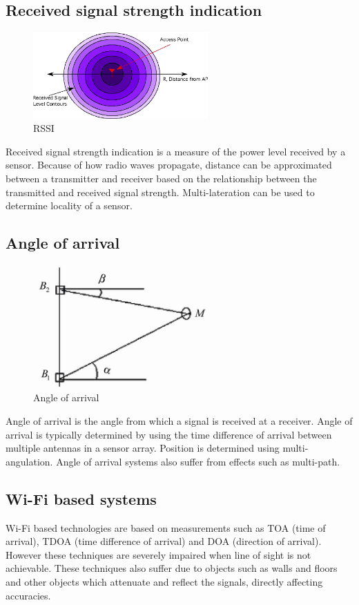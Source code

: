 \documentclass[11pt,a4paper]{report}
\begin{document}
	\subsection{Received signal strength indication}
		\begin{figure}[h!]
			\centering
			\includegraphics[width=0.6\textwidth]{rssi}
			\caption{RSSI}
		\end{figure}
		Received signal strength indication is a measure of the power level received by a sensor. Because of how radio waves propagate, distance can be approximated between a transmitter and receiver based on the relationship between the transmitted and received signal strength. Multi-lateration can be used to determine locality of a sensor.
	
	\subsection{Angle of arrival}
		\begin{figure}[h!]
			\centering
			\includegraphics[width=0.6\textwidth]{angle_of_arrival}
			\caption{Angle of arrival}
		\end{figure}
		Angle of arrival is the angle from which a signal is received at a receiver. Angle of arrival is typically determined by using the time difference of arrival between multiple antennas in a sensor array. Position is determined using multi-angulation.
		Angle of arrival systems also suffer from effects such as multi-path.
	
	\subsection{Wi-Fi based systems}
		Wi-Fi based technologies are based on measurements such as TOA (time of arrival), TDOA (time difference of arrival) and DOA (direction of arrival). However these techniques are severely impaired when line of sight is not achievable. These techniques also suffer due to objects such as walls and floors and other objects which attenuate and reflect the signals, directly affecting accuracies.
	
\end{document}
